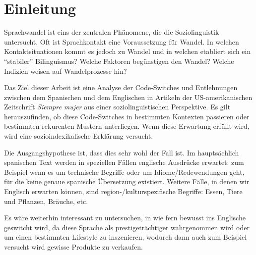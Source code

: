 \section{Einleitung}

\begin{comment}
* ca 3/4 Seiten
* Untersuchungsgegenstand
* Erkenntnisinteresse
* Forschungsstand
* Vorgehensweise: also Section 2 macht blabla, Section 3 blablup, ....
* Ergebnisse können/sollen angedeuten werden
\end{comment}




Sprachwandel ist eins der zentralen Phänomene, die die Soziolinguistik untersucht.
Oft ist Sprachkontakt eine Voraussetzung für Wandel.
In welchen Kontaktsituationen kommt es jedoch zu Wandel und in welchen etabliert sich ein ``stabiler'' Bilinguismus?
Welche Faktoren begünstigen den Wandel?
Welche Indizien weisen auf Wandelprozesse hin?


Das Ziel dieser Arbeit ist eine Analyse der Code-Switches und Entlehnungen zwischen dem Spanischen und dem Englischen in Artikeln der US-amerikanischen Zeitschrift \textit{Siempre mujer} aus einer soziolinguistischen Perspektive.
Es gilt herauszufinden, ob diese Code-Switches in bestimmten Kontexten passieren oder bestimmten rekurenten Mustern unterliegen.
Wenn diese Erwartung erfüllt wird, wird eine sozioindexikalische Erklärung versucht.

Die Ausgangshypothese ist, dass dies sehr wohl der Fall ist.
Im hauptsächlich spanischen Text werden in speziellen Fällen englische Ausdrücke erwartet:
zum Beispiel wenn es um technische Begriffe oder um Idiome/Redewendungen geht, für die keine genaue spanische Übersetzung existiert.
Weitere Fälle, in denen wir Englisch erwarten können, sind region-/kulturspezifische Begriffe: Essen, Tiere und Pflanzen, Bräuche, etc.

Es wäre weiterhin interessant zu untersuchen, in wie fern bewusst ins Englische geswitcht wird, da diese Sprache als prestigeträchtiger wahrgenommen wird oder um einen bestimmten Lifestyle zu inszenieren, wodurch dann auch zum Beispiel versucht wird gewisse Produkte zu verkaufen.

